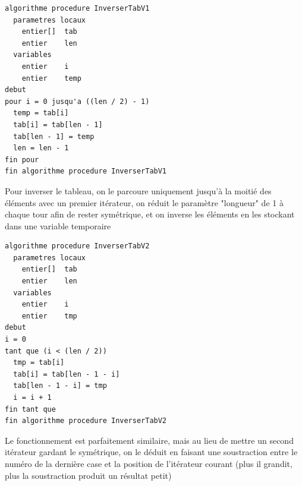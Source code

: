 \documentclass[11pt,a4paper]{article}
\begin{document}
\vfillLast

\newpage


\begin{table}[ht!]
  \centering
\begin{lstlisting}[style=algorithmique]
algorithme procedure InverserTabV1
  parametres locaux
    entier[]  tab
    entier    len
  variables
    entier    i
    entier    temp
debut
pour i = 0 jusqu'a ((len / 2) - 1)
  temp = tab[i]
  tab[i] = tab[len - 1]
  tab[len - 1] = temp
  len = len - 1
fin pour
fin algorithme procedure InverserTabV1 \end{lstlisting}
  \caption{Pour inverser le tableau, on le parcoure uniquement jusqu'à la moitié des éléments avec un premier itérateur, on réduit le paramètre "longueur" de 1 à chaque tour afin de rester symétrique, et on inverse les éléments en les stockant dans une variable temporaire }
\end{table}


\begin{table}[ht!]
  \centering
\begin{lstlisting}[style=algorithmique]
algorithme procedure InverserTabV2
  parametres locaux
    entier[]  tab
    entier    len
  variables
    entier    i
    entier    tmp
debut
i = 0
tant que (i < (len / 2))
  tmp = tab[i]
  tab[i] = tab[len - 1 - i]
  tab[len - 1 - i] = tmp
  i = i + 1
fin tant que
fin algorithme procedure InverserTabV2 \end{lstlisting}
  \caption{Le fonctionnement est parfaitement similaire, mais au lieu de mettre un second itérateur gardant le symétrique, on le déduit en faisant une soustraction entre le numéro de la dernière case et la position de l'itérateur courant (plus il grandit, plus la soustraction produit un résultat petit) }
\end{table}



\newpage

\vfillFirst

\end{document}
